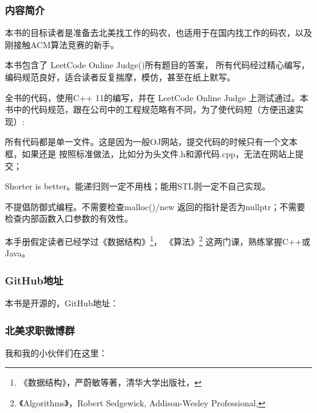 \subsubsection{内容简介}
本书的目标读者是准备去北美找工作的码农，也适用于在国内找工作的码农，以及刚接触ACM算法竞赛的新手。

本书包含了 LeetCode Online Judge()所有题目的答案，
所有代码经过精心编写，编码规范良好，适合读者反复揣摩，模仿，甚至在纸上默写。

全书的代码，使用C++ 11的编写，并在 LeetCode Online Judge 上测试通过。本书中的代码规范，跟在公司中的工程规范略有不同，为了使代码短（方便迅速实现）:

\begindot
\item 所有代码都是单一文件。这是因为一般OJ网站，提交代码的时候只有一个文本框，如果还是
按照标准做法，比如分为头文件.h和源代码.cpp，无法在网站上提交；

\item Shorter is better。能递归则一定不用栈；能用STL则一定不自己实现。

\item 不提倡防御式编程。不需要检查malloc()/new 返回的指针是否为nullptr；不需要检查内部函数入口参数的有效性。
\myenddot

本手册假定读者已经学过《数据结构》\footnote{《数据结构》，严蔚敏等著，清华大学出版社，
}，
《算法》\footnote{《Algorithms》，Robert Sedgewick, Addison-Wesley Professional, }
这两门课，熟练掌握C++或Java。

\subsubsection{GitHub地址}
本书是开源的，GitHub地址：

\subsubsection{北美求职微博群}
我和我的小伙伴们在这里：
